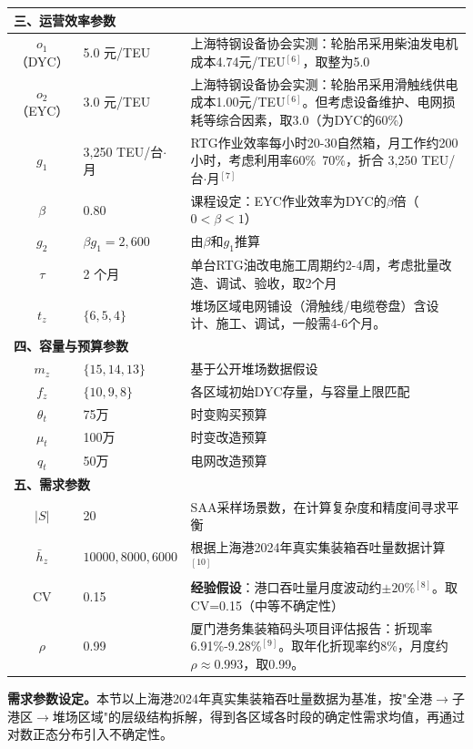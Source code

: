 \documentclass[12pt,a4paper]{article}
\newcommand{\手批注}[2]{\textcolor{#1}{\text{\kaishu #2}}}
\newcommand{\一阶段}{\textcolor{firststage}{\text{\kaishu （一阶段）}}}
\newcommand{\二阶段}{\textcolor{secondstage}{\text{\kaishu （二阶段）}}}
\begin{document}
\begin{footnotesize}
\begin{longtable}{clp{10cm}}
\midrule
\multicolumn{3}{l}{\textbf{三、运营效率参数}} \\
\midrule
$o_1$（DYC） & 5.0 元/TEU & 上海特钢设备协会实测：轮胎吊采用柴油发电机成本4.74元/TEU$^{[6]}$，取整为5.0\\
$o_2$（EYC） & 3.0 元/TEU & 上海特钢设备协会实测：轮胎吊采用滑触线供电成本1.00元/TEU$^{[6]}$。但考虑设备维护、电网损耗等综合因素，取3.0（为DYC的60\%） \\
$g_1$ & 3,250 TEU/台$\cdot$月 & RTG作业效率每小时20-30自然箱，月工作约200小时，考虑利用率60\%~70\%，折合 3,250 TEU/台$\cdot$月$^{[7]}$ \\
$\beta$ & 0.80 & 课程设定：EYC作业效率为DYC的$\beta$倍（$0<\beta<1$） \\
$g_2$ & $\beta g_1 = 2,600$ & 由$\beta$和$g_1$推算 \\
$\tau$ & 2 个月 & 单台RTG油改电施工周期约2-4周，考虑批量改造、调试、验收，取2个月 \\
$t_z$ & $\{6,5,4\}$ & 堆场区域电网铺设（滑触线/电缆卷盘）含设计、施工、调试，一般需4-6个月。\\

\midrule
\multicolumn{3}{l}{\textbf{四、容量与预算参数}} \\
\midrule
$m_z$ & $\{15,14,13\}$ & 基于公开堆场数据假设\\
$f_z$ & $\{10,9,8\}$ & 各区域初始DYC存量，与容量上限匹配 \\
$\theta_t$ & 75万 & 时变购买预算 \\
$\mu_t$ & 100万 & 时变改造预算 \\
$q_t$ & 50万 & 电网改造预算\\

\midrule
\multicolumn{3}{l}{\textbf{五、需求参数}} \\
\midrule
$|S|$ & 20 & SAA采样场景数，在计算复杂度和精度间寻求平衡 \\
$\bar{h}_z$ & ${10000,8000,6000}$ & 根据上海港2024年真实集装箱吞吐量数据计算$^{[10]}$\\
$\text{CV}$ & 0.15 & \textbf{经验假设}：港口吞吐量月度波动约$\pm20\%$$^{[8]}$。取CV=0.15（中等不确定性）\\
$\rho$ & 0.99 & 厦门港务集装箱码头项目评估报告：折现率6.91\%-9.28\%$^{[9]}$。取年化折现率约8\%，月度约$\rho \approx 0.993$，取0.99。 \\

\bottomrule
\end{longtable}
\end{footnotesize}

\vspace{0.8em}
\noindent\textbf{需求参数设定。}本节以上海港2024年真实集装箱吞吐量数据为基准，按"全港$\to$子港区$\to$堆场区域"的层级结构拆解，得到各区域各时段的确定性需求均值，再通过对数正态分布引入不确定性。
\end{document}
